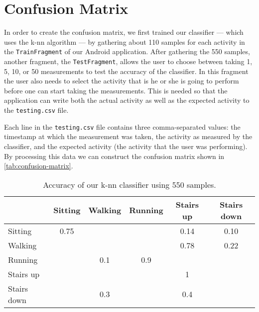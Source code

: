 \section{Confusion Matrix}
\label{sec:confusion-matrix}
In order to create the confusion matrix, we first trained our classifier --- which uses the k-nn algorithm --- by gathering about 110 samples for each activity in the \texttt{TrainFragment} of our Android application. After gathering the 550 samples, another fragment, the \texttt{TestFragment}, allows the user to choose between taking 1, 5, 10, or 50 measurements to test the accuracy of the classifier. In this fragment the user also needs to select the activity that is he or she is going to perform before one can start taking the measurements. This is needed so that the application can write both the actual activity as well as the expected activity to the \texttt{testing.csv} file.

Each line in the \texttt{testing.csv} file contains three comma-separated values: the timestamp at which the measurement was taken, the activity as measured by the classifier, and the expected activity (the activity that the user was performing). By processing this data we can construct the confusion matrix shown in \autoref{tab:confusion-matrix}.

\begin{table}[ht]
\centering
\caption{Accuracy of our k-nn classifier using 550 samples.}
\begin{tabular}{lccccc}
\toprule
 & Sitting & Walking & Running & Stairs up & Stairs down\\
\midrule
Sitting & 0.75 &  &  &  0.14 & 0.10\\
Walking &  &  &  & 0.78 & 0.22\\
Running &  & 0.1 & 0.9 &  & \\
Stairs up &  &  &  & 1 & \\
Stairs down &  & 0.3 &  & 0.4 & \\
\bottomrule
\end{tabular}
\label{tab:confusion-matrix}
\end{table}
